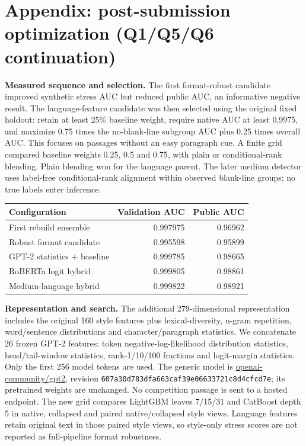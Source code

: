 \documentclass[10pt,letterpaper]{article}
\begin{document}
\section*{Appendix: post-submission optimization (Q1/Q5/Q6 continuation)}
\textbf{Measured sequence and selection.} The first format-robust candidate improved synthetic stress AUC but reduced public AUC, an informative negative result. The language-feature candidate was then selected using the original fixed holdout: retain at least 25\% baseline weight, require native AUC at least 0.9975, and maximize 0.75 times the no-blank-line subgroup AUC plus 0.25 times overall AUC. This focuses on passages without an easy paragraph cue. A finite grid compared baseline weights 0.25, 0.5 and 0.75, with plain or conditional-rank blending. Plain blending won for the language parent. The later medium detector uses label-free conditional-rank alignment within observed blank-line groups; no true labels enter inference.

\par\noindent
\begin{tabularx}{\linewidth}{@{}Yrr@{}}
\toprule
Configuration & Validation AUC & Public AUC \\ \midrule
First rebuild ensemble & 0.997975 & 0.96962 \\
Robust format candidate & 0.995598 & 0.95899 \\
GPT-2 statistics + baseline & 0.999785 & 0.98665 \\
RoBERTa logit hybrid & 0.999805 & 0.98861 \\
Medium-language hybrid & 0.999822 & 0.98921 \\
\bottomrule
\end{tabularx}

\par
\textbf{Representation and search.} The additional 279-dimensional representation includes the original 160 style features plus lexical-diversity, n-gram repetition, word/sentence distributions and character/paragraph statistics. We concatenate 26 frozen GPT-2 features: token negative-log-likelihood distribution statistics, head/tail-window statistics, rank-1/10/100 fractions and logit-margin statistics. Only the first 256 model tokens are used.
The generic model is \href{https://huggingface.co/openai-community/gpt2}{openai-community/gpt2}, revision \texttt{607a30d783dfa663caf39e06633721c8d4cfcd7e}; its pretrained weights are unchanged. No competition passage is sent to a hosted endpoint.
The new grid compares LightGBM leaves 7/15/31 and CatBoost depth 5 in native, collapsed and paired native/collapsed style views. Language features retain original text in those paired style views, so style-only stress scores are not reported as full-pipeline format robustness.
\end{document}
